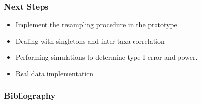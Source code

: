 \documentclass{beamer}
\begin{document}
\begin{frame}
    \frametitle{Next Steps}  
    \begin{itemize}
        \item Implement the resampling procedure in the prototype
        \item Dealing with singletons and inter-taxa correlation 
        \item Performing simulations to determine type I error and power. 
        \item Real data implementation  
    \end{itemize}
\end{frame}


\begin{frame}
    \frametitle{Bibliography}
    {}
    
\end{frame}
\end{document}

